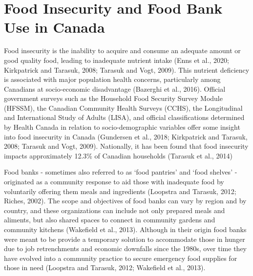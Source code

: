 \documentclass[]{elsarticle} %
\begin{document}
\hypertarget{food-insecurity-and-food-bank-use-in-canada}{%
\section{Food Insecurity and Food Bank Use in
Canada}\label{food-insecurity-and-food-bank-use-in-canada}}

Food insecurity is the inability to acquire and consume an adequate
amount or good quality food, leading to inadequate nutrient intake (Enns
et al., 2020; Kirkpatrick and Tarasuk, 2008; Tarasuk and Vogt, 2009).
This nutrient deficiency is associated with major population health
concerns, particularly among Canadians at socio-economic disadvantage
(Bazerghi et al., 2016). Official government surveys such as the
Household Food Security Survey Module (HFSSM), the Canadian Community
Health Surveys (CCHS), the Longitudinal and International Study of
Adults (LISA), and official classifications determined by Health Canada
in relation to socio-demographic variables offer some insight into food
insecurity in Canada (Gundersen et al., 2018; Kirkpatrick and Tarasuk,
2008; Tarasuk and Vogt, 2009). Nationally, it has been found that food
insecurity impacts approximately 12.3\% of Canadian households (Tarasuk
et al., 2014)

Food banks - sometimes also referred to as `food pantries' and `food
shelves' - originated as a community response to aid those with
inadequate food by voluntarily offering them meals and ingredients
(Loopstra and Tarasuk, 2012; Riches, 2002). The scope and objectives of
food banks can vary by region and by country, and these organizations
can include not only prepared meals and aliments, but also shared spaces
to connect in community gardens and community kitchens (Wakefield et
al., 2013). Although in their origin food banks were meant to be provide
a temporary solution to accommodate those in hunger due to job
retrenchments and economic downfalls since the 1980s, over time they
have evolved into a community practice to secure emergency food supplies
for those in need (Loopstra and Tarasuk, 2012; Wakefield et al., 2013).
\end{document}
